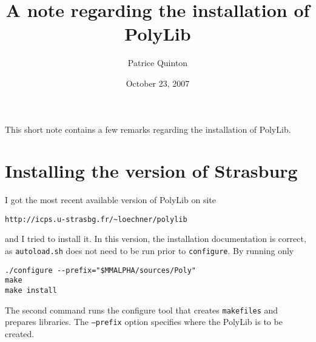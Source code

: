 \documentclass[12pt]{article}
\begin{document}
\newcommand{\polylib}{{\sc PolyLib}}
\title{A note regarding the installation of \polylib{}}
\author{Patrice Quinton}
\date{October 23, 2007}
\maketitle
This short note contains a few remarks regarding the installation of \polylib{}.





\section{Installing the version of Strasburg}
I got the most recent available version of \polylib{} on site 
\begin{verbatim}
http://icps.u-strasbg.fr/~loechner/polylib
\end{verbatim}
and I tried to install it. In this version, the installation documentation is correct, as
\texttt{autoload.sh} does not need to be run prior to \texttt{configure}. By running
only 
\begin{verbatim}
./configure --prefix="$MMALPHA/sources/Poly"
make
make install
\end{verbatim}
The second command runs the configure tool that creates \texttt{makefiles} and prepares
libraries. The \texttt{--prefix} option specifies where the \polylib{} is to be created.
\end{document}
